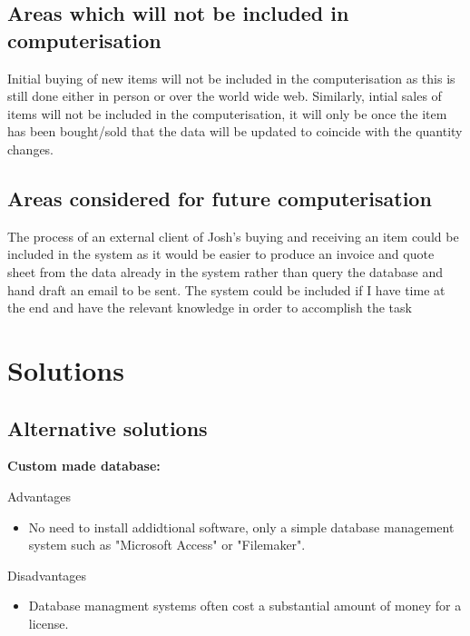 \subsection{Areas which will not be included in computerisation}

Initial buying of new items will not be included in the computerisation as this is still done either in person or over the world wide web. Similarly, intial sales of items will not be included in the computerisation, it will only be once the item has been bought/sold that the data will be updated to coincide with the quantity changes.

\subsection{Areas considered for future computerisation}

The process of an external client of Josh's buying and receiving an item could be included in the system as it would be easier to produce an invoice and quote sheet from the data already in the system rather than query the database and hand draft an email to be sent. The system could be included if I have time at the end and have the relevant knowledge in order to accomplish the task

\section{Solutions}

\subsection{Alternative solutions}



\textbf{Custom made database:}

Advantages
\begin{itemize}
    \item No need to install addidtional software, only a simple database management system such as "Microsoft Access" or "Filemaker".
\end{itemize}

Disadvantages
\begin{itemize}
    \item Database managment systems often cost a substantial amount of money for a license.\\
\end{itemize} \hline



